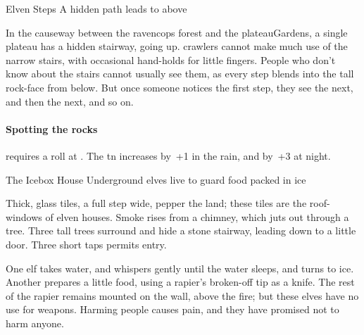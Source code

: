 \begin{multicols}{2}
{Elven Steps}%
{A hidden path leads to  above}%
\label{hiddenStairs}

In the causeway between the \gls{ravencops} forest and the \gls{plateauGardens}, a single plateau has a hidden stairway, going up.
\Glspl{crawler} cannot make much use of the narrow stairs, with occasional hand-holds for little fingers.
People who don't know about the stairs cannot usually see them, as every step blends into the tall rock-face from below.
But once someone notices the first step, they see the next, and then the next, and so on.

\paragraph{Spotting the rocks}
requires a  roll at \tn[12].
The \gls{tn} increases by~+1 in the rain, and by~+3 at night.

{The Icebox House}%
{Underground elves live to guard food packed in ice}%
\label{iceboxHouse}


Thick, glass tiles, a full step wide, pepper the land; these tiles are the roof-windows of elven houses.%
Smoke rises from a chimney, which juts out through a tree.
Three tall trees surround and hide a stone stairway, leading down to a little door.
Three short taps permits entry.

\begin{boxtext}
  One elf takes water, and whispers gently until the water sleeps, and turns to ice.
  Another prepares a little food, using a rapier's broken-off tip as a knife.
  The rest of the rapier remains mounted on the wall, above the fire; but these elves have no use for weapons.
  Harming people causes pain, and they have promised not to harm anyone.
\end{boxtext}


\end{multicols}
